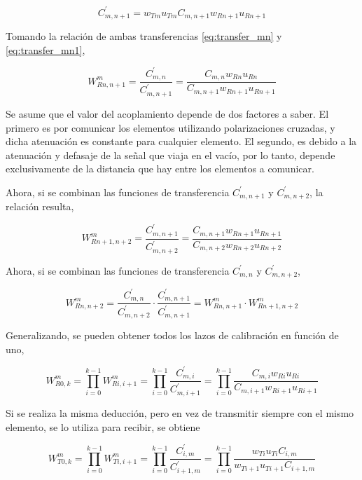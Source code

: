 \begin{equation}
	C^{'}_{m,n + 1} = w_{Tm} u_{Tm} C_{m,n + 1} w_{Rn + 1} u_{Rn + 1}
	\label{eq:transfer_mn1}
\end{equation}

Tomando la relación de ambas transferencias \ref{eq:transfer_mn} y \ref{eq:transfer_mn1},

\begin{equation}
	W^{m}_{Rn,n + 1} = \dfrac{C^{'}_{m,n}}{C^{'}_{m,n + 1}} = \dfrac{C_{m,n} w_{Rn} u_{Rn}}{C_{m,n + 1} w_{Rn + 1} u_{Rn + 1}}
\end{equation}

Se asume que el valor del acoplamiento depende de dos factores a saber. El primero es por comunicar los elementos utilizando
polarizaciones cruzadas, y dicha atenuación es constante para cualquier elemento. El segundo, es debido a la atenuación y
defasaje de la señal que viaja en el vacío, por lo tanto, depende exclusivamente de la distancia que hay entre los elementos
a comunicar.

Ahora, si se combinan las funciones de transferencia $C^{'}_{m,n+1}$ y $C^{'}_{m,n+2}$, la relación resulta,

\begin{equation}
	W^{m}_{Rn + 1,n + 2} = \dfrac{C^{'}_{m,n+1}}{C^{'}_{m,n+2}} = \dfrac{C_{m,n+1} w_{Rn+1} u_{Rn+1}}{C_{m,n + 2} w_{Rn + 2} u_{Rn + 2}}
\end{equation}

Ahora, si se combinan las funciones de transferencia $C^{'}_{m,n}$ y $C^{'}_{m,n+2}$,

\begin{equation}
	W^{m}_{Rn,n + 2} = \dfrac{C^{'}_{m,n}}{C^{'}_{m,n + 2}}\cdot\dfrac{C^{'}_{m,n+1}}{C^{'}_{m,n+1}} = W^{m}_{Rn,n+1}\cdot W^{m}_{Rn+1,n + 2}
\end{equation}

Generalizando, se pueden obtener todos los lazos de calibración en función de uno,

\begin{equation}
	W^{m}_{R0,k} = \prod_{i=0}^{k-1} W^{m}_{Ri,i+1} = \prod_{i=0}^{k-1}\dfrac{C^{'}_{m,i}}{C^{'}_{m,i+1}} =
		\prod_{i=0}^{k-1}\dfrac{C_{m,i} w_{Ri} u_{Ri}}{C_{m,i + 1} w_{Ri + 1} u_{Ri + 1}}
	\label{eq:rx_cal}
\end{equation}

Si se realiza la misma deducción, pero en vez de transmitir siempre con el mismo elemento, se lo utiliza para recibir, se obtiene

\begin{equation}
	W^{m}_{T0,k} = \prod_{i=0}^{k-1} W^{m}_{Ti,i+1} = \prod_{i=0}^{k-1}\dfrac{C^{'}_{i,m}}{C^{'}_{i+1, m}} =
		\prod_{i=0}^{k-1}\dfrac{w_{Ti} u_{Ti} C_{i,m}}{w_{Ti + 1} u_{Ti + 1}C_{i + 1, m}}
	\label{eq:tx_cal}
\end{equation}

